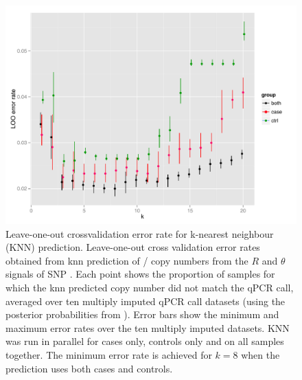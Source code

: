 \begin{figure}[h!]
  \centering
  \includegraphics[scale=.75]{figures/Figure-3.pdf}
  {Leave-one-out crossvalidation error rate for k-nearest neighbour (KNN) prediction.}
  {
  Leave-one-out cross validation error rates
  obtained from \gls{knn} prediction
  of / copy numbers from the $R$ and $\theta$ signals of SNP .
  Each point shows the proportion of samples for which the \gls{knn} predicted copy number did not 
  match the qPCR call, averaged over ten multiply imputed qPCR call datasets
  (using the posterior probabilities from ). 
  Error bars show the minimum and maximum error rates over the ten multiply imputed datasets.
  KNN was run in parallel for cases only, controls only and on all samples together.
  The minimum error rate is achieved for $k=8$ when the prediction uses both cases and controls.}
\end{figure}

